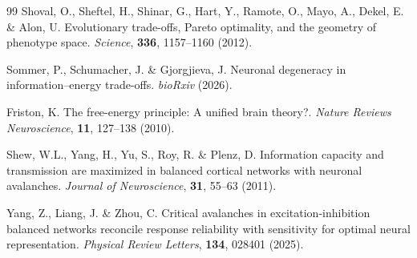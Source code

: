 \begin{thebibliography}{99}
 Shoval, O., Sheftel, H., Shinar, G., Hart, Y., Ramote, O., Mayo, A., Dekel, E. \& Alon, U. Evolutionary trade-offs, Pareto optimality, and the geometry of phenotype space. \emph{Science}, \textbf{336}, 1157--1160 (2012).

 Sommer, P., Schumacher, J. \& Gjorgjieva, J. Neuronal degeneracy in information–energy trade-offs. \emph{bioRxiv} (2026).

 Friston, K. The free-energy principle: A unified brain theory?. \emph{Nature Reviews Neuroscience}, \textbf{11}, 127--138 (2010).

 Shew, W.L., Yang, H., Yu, S., Roy, R. \& Plenz, D. Information capacity and transmission are maximized in balanced cortical networks with neuronal avalanches. \emph{Journal of Neuroscience}, \textbf{31}, 55--63 (2011).

 Yang, Z., Liang, J. \& Zhou, C. Critical avalanches in excitation-inhibition balanced networks reconcile response reliability with sensitivity for optimal neural representation. \emph{Physical Review Letters}, \textbf{134}, 028401 (2025).

\end{thebibliography}
